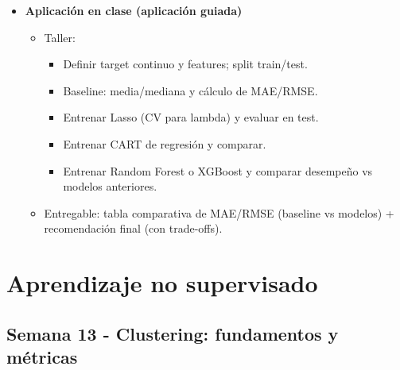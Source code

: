 \documentclass{article}
\begin{document}
\begin{itemize}
\item \textbf{Aplicación en clase (aplicación guiada)}
\begin{itemize}
  \item Taller:
  \begin{itemize}
    \item Definir target continuo y features; split train/test.
    \item Baseline: media/mediana y cálculo de MAE/RMSE.
    \item Entrenar Lasso (CV para lambda) y evaluar en test.
    \item Entrenar CART de regresión y comparar.
    \item Entrenar Random Forest o XGBoost y comparar desempeño vs modelos anteriores.
  \end{itemize}
  \item Entregable: tabla comparativa de MAE/RMSE (baseline vs modelos) + recomendación final (con trade-offs).
\end{itemize}
\end{itemize}

\newpage
\section{Aprendizaje no supervisado}

\subsection{Semana 13 - Clustering: fundamentos y métricas}
\vspace{0.2 cm}

\end{document}
